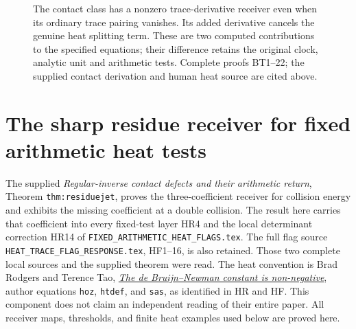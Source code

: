 \documentclass[11pt,a4paper]{article}
\theoremstyle{definition}\newtheorem{definition}[theorem]{Definition}
\begin{document}
\begin{figure}[p]
\centering
{}
\caption{The contact class has a nonzero trace-derivative receiver even
when its ordinary trace pairing vanishes. Its added derivative cancels
the genuine heat splitting term. These are two computed contributions
to the specified equations; their difference retains the original clock,
analytic unit and arithmetic tests. Complete proofs BT1--22; the
supplied contact derivation and human heat source are cited above.}
\end{figure}

\clearpage
\section{The sharp residue receiver for fixed arithmetic heat tests}
\label{sec:residue-fixed-receiver}

The supplied \emph{Regular-inverse contact defects and their arithmetic
return}, Theorem \texttt{thm:residuejet}, proves the three-coefficient
receiver for collision energy and exhibits the missing coefficient at a
double collision. The result here carries that coefficient into every
fixed-test layer HR4 and the local determinant correction HR14 of
\texttt{FIXED\_ARITHMETIC\_HEAT\_FLAGS.tex}. The full flag source
\texttt{HEAT\_TRACE\_FLAG\_RESPONSE.tex}, HF1--16, is also retained.
Those two complete local sources and the supplied theorem were read.
The heat convention is Brad Rodgers and Terence Tao,
\href{https://arxiv.org/abs/1801.05914v5}{\emph{The de Bruijn--Newman
constant is non-negative}}, author equations \texttt{hoz},
\texttt{htdef}, and \texttt{sas}, as identified in HR and HF. This
component does not claim an independent reading of their entire paper.
All receiver maps, thresholds, and finite heat examples used below are
proved here.
\end{document}
